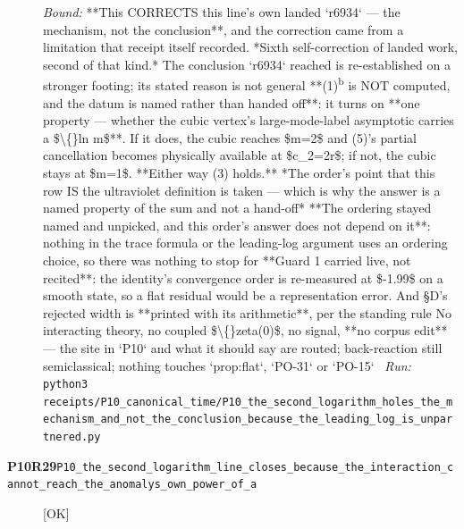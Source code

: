 \begin{description}
 \emph{Bound:}  **This CORRECTS this line's own landed `r6934` --- the mechanism, not the conclusion**, and the correction came from a limitation that receipt itself recorded. *Sixth self-correction of landed work, second of that kind.* The conclusion `r6934` reached is re-established on a stronger footing; its stated reason is not general  **(1)\textsuperscript{b} is NOT computed, and the datum is named rather than handed off**: it turns on **one property --- whether the cubic vertex's large-mode-label asymptotic carries a \$\textbackslash\{\}ln m\$**. If it does, the cubic reaches \$m=2\$ and (5)'s partial cancellation becomes physically available at \$c\_2=2r\$; if not, the cubic stays at \$m=1\$. **Either way (3) holds.**  *The order's point that this row IS the ultraviolet definition is taken --- which is why the answer is a named property of the sum and not a hand-off*  **The ordering stayed named and unpicked, and this order's answer does not depend on it**: nothing in the trace formula or the leading-log argument uses an ordering choice, so there was nothing to stop for  **Guard 1 carried live, not recited**: the identity's convergence order is re-measured at \$-1.99\$ on a smooth state, so a flat residual would be a representation error. And \S{}D's rejected width is **printed with its arithmetic**, per the standing rule  No interacting theory, no coupled \$\textbackslash\{\}zeta(0)\$, no signal, **no corpus edit** --- the site in `P10` and what it should say are routed; back-reaction still semiclassical; nothing touches `prop:flat`, `PO-31` or `PO-15`
\ \emph{Run:} \texttt{python3 receipts/P10\_canonical\_time/P10\_the\_second\_logarithm\_holes\_the\_mechanism\_and\_not\_the\_conclusion\_because\_the\_leading\_log\_is\_unpartnered.py}
\item[\rcptlabel{P10_the_second_logarithm_line_closes_because_the_interaction_cannot_reach_the_anomalys_own_power_of_a}{P10R29}\textbf{P10R29}\quad\texttt{P10\_the\_second\_logarithm\_line\_closes\_because\_the\_interaction\_cannot\_reach\_the\_anomalys\_own\_power\_of\_a}]\hfill\textsf{[OK]}\\

\end{description}
